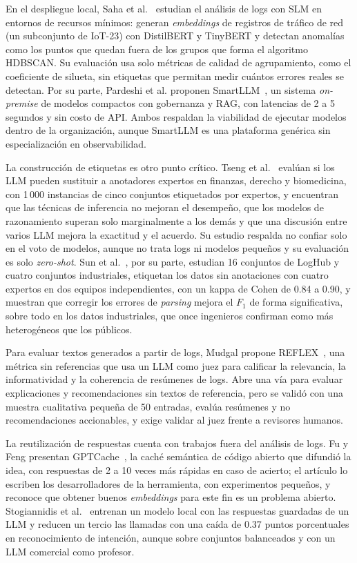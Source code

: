 En el despliegue local, Saha et al.~\cite{saha2025_slm_minimal} estudian el análisis de logs con SLM en entornos de recursos mínimos: generan \textit{embeddings} de registros de tráfico de red (un subconjunto de IoT-23) con DistilBERT y TinyBERT y detectan anomalías como los puntos que quedan fuera de los grupos que forma el algoritmo HDBSCAN. Su evaluación usa solo métricas de calidad de agrupamiento, como el coeficiente de silueta, sin etiquetas que permitan medir cuántos errores reales se detectan. Por su parte, Pardeshi et al. proponen SmartLLM~\cite{pardeshi2026_smartllm}, un sistema \textit{on-premise} de modelos compactos con gobernanza y RAG, con latencias de 2 a 5 segundos y sin costo de API. Ambos respaldan la viabilidad de ejecutar modelos dentro de la organización, aunque SmartLLM es una plataforma genérica sin especialización en observabilidad.

La construcción de etiquetas es otro punto crítico. Tseng et al.~\cite{tseng2025_expert_annotators} evalúan si los LLM pueden sustituir a anotadores expertos en finanzas, derecho y biomedicina, con 1\,000 instancias de cinco conjuntos etiquetados por expertos, y encuentran que las técnicas de inferencia no mejoran el desempeño, que los modelos de razonamiento superan solo marginalmente a los demás y que una discusión entre varios LLM mejora la exactitud y el acuerdo. Su estudio respalda no confiar solo en el voto de modelos, aunque no trata logs ni modelos pequeños y su evaluación es solo \textit{zero-shot}. Sun et al.~\cite{sun2026_parsing}, por su parte, estudian 16 conjuntos de LogHub y cuatro conjuntos industriales, etiquetan los datos sin anotaciones con cuatro expertos en dos equipos independientes, con un kappa de Cohen de 0.84 a 0.90, y muestran que corregir los errores de \textit{parsing} mejora el $F_1$ de forma significativa, sobre todo en los datos industriales, que once ingenieros confirman como más heterogéneos que los públicos.

Para evaluar textos generados a partir de logs, Mudgal propone REFLEX~\cite{mudgal2025_reflex}, una métrica sin referencias que usa un LLM como juez para calificar la relevancia, la informatividad y la coherencia de resúmenes de logs. Abre una vía para evaluar explicaciones y recomendaciones sin textos de referencia, pero se validó con una muestra cualitativa pequeña de 50 entradas, evalúa resúmenes y no recomendaciones accionables, y exige validar al juez frente a revisores humanos.

La reutilización de respuestas cuenta con trabajos fuera del análisis de logs. Fu y Feng presentan GPTCache~\cite{fu2023_gptcache}, la caché semántica de código abierto que difundió la idea, con respuestas de 2 a 10 veces más rápidas en caso de acierto; el artículo lo escriben los desarrolladores de la herramienta, con experimentos pequeños, y reconoce que obtener buenos \textit{embeddings} para este fin es un problema abierto. Stogiannidis et al.~\cite{stogiannidis2023_cache} entrenan un modelo local con las respuestas guardadas de un LLM y reducen un tercio las llamadas con una caída de 0.37 puntos porcentuales en reconocimiento de intención, aunque sobre conjuntos balanceados y con un LLM comercial como profesor.

